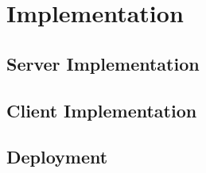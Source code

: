 \chapter{Implementation} \label{chap:implementation}

\section{Server Implementation}

\section{Client Implementation}

\section{Deployment}
